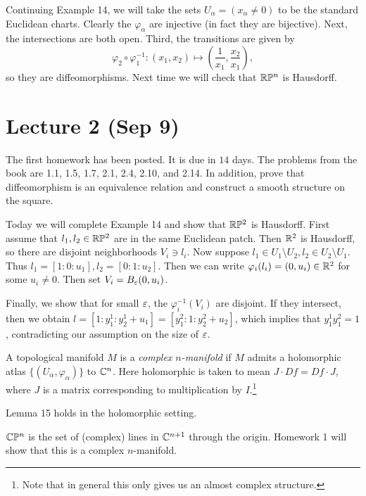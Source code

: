 \documentclass[twoside, 10pt]{article}
\begin{document}
    Continuing Example 14, we will take the sets $U_{\alpha} = (x_{\alpha}\neq 0)$ to be the standard Euclidean charts. Clearly the $\varphi_{\alpha}$ are injective (in fact they are bijective). Next, the intersections are both open. Third, the transitions are given by \[\varphi_2 \circ \varphi_1^{-1}: (x_1,x_2) \mapsto \left( \frac{1}{x_1}, \frac{x_2}{x_1} \right),\]so they are diffeomorphisms. Next time we will check that $\mathbb{R}\mathbb{P}^n$ is Hausdorff.

    \section{Lecture 2 (Sep 9)}%
    \label{sec:lecture_2_sep_9_}

    The first homework has been posted. It is due in $14$ days. The problems from the book are 1.1, 1.5, 1.7, 2.1, 2.4, 2.10, and 2.14. In addition, prove that diffeomorphism is an equivalence relation and construct a smooth structure on the square.
    
    Today we will complete Example 14 and show that $\mathbb{R}\mathbb{P}^2$ is Hausdorff. First assume that $l_1, l_2 \in \mathbb{R}\mathbb{P}^2$ are in the same Euclidean patch. Then $\mathbb{R}^2$ is Hausdorff, so there are disjoint neighborhoods $V_i \ni l_i$. Now suppose $l_1 \in U_1 \setminus U_2, l_2 \in U_2 \setminus U_1$. Thus $l_1 = [1:0:u_1], l_2 = [0:1:u_2]$. Then we can write $\varphi_i(l_i) = (0, u_i) \in \mathbb{R}^2$ for some $u_i \neq 0$. Then set $V_i = B_{\varepsilon}(0, u_i)$. 
           
    Finally, we show that for small $\varepsilon$, the $\varphi_i^{-1}(V_i)$ are disjoint. If they intersect, then we obtain $l = [1:y^1_1:y_2^1 + u_1] = [y_1^2:1:y_2^2+u_2]$, which implies that $y_1^1y_1^2 = 1$, contradicting our assumption on the size of $\varepsilon$.

    \begin{defn}
        A topological manifold $M$ is a \textit{complex $n$-manifold} if $M$ admits a holomorphic atlas $\{(U_{\alpha}, \varphi_{\alpha})\}$ to $\mathbb{C}^n$. Here holomorphic is taken to mean $J \cdot Df = Df \cdot J$, where $J$ is a matrix corresponding to multiplication by $I$.\footnote{Note that in general this only gives us an almost complex structure.}
    \end{defn}

    \begin{thm}
        Lemma 15 holds in the holomorphic setting.
    \end{thm}

    \begin{exm}
        $\mathbb{C}\mathbb{P}^n$ is the set of (complex) lines in $\mathbb{C}^{n+1}$ through the origin. Homework 1 will show that this is a complex $n$-manifold.
    \end{exm}
\end{document}
